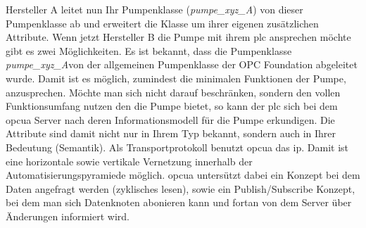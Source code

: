 Hersteller A leitet nun Ihr Pumpenklasse (\emph{pumpe\_xyz\_A}) von dieser Pumpenklasse ab und erweitert die Klasse um ihrer eigenen zusätzlichen Attribute.
Wenn jetzt Hersteller B die Pumpe mit ihrem \ac{plc} ansprechen möchte gibt es zwei Möglichkeiten.
Es ist bekannt, dass die Pumpenklasse \glqq \emph{pumpe\_xyz\_A}\grqq{}von der allgemeinen Pumpenklasse der OPC Foundation abgeleitet wurde.
Damit ist es möglich, zumindest die minimalen Funktionen der Pumpe, anzusprechen. 
Möchte man sich nicht darauf beschränken, sondern den vollen Funktionsumfang nutzen den die Pumpe bietet, 
so kann der \ac{plc} sich bei dem \ac{opcua} Server nach deren Informationsmodell für die Pumpe erkundigen.
Die Attribute sind damit nicht nur in Ihrem Typ bekannt, sondern auch in Ihrer Bedeutung (Semantik).
Als Transportprotokoll benutzt \ac{opcua} das \ac{ip}. 
Damit ist eine horizontale sowie vertikale Vernetzung innerhalb der Automatisierungspyramiede möglich.
\ac{opcua} untersützt dabei ein Konzept bei dem Daten angefragt werden (zyklisches lesen), sowie ein Publish/Subscribe Konzept, 
bei dem man sich Datenknoten abonieren kann und fortan von dem Server über Änderungen informiert wird.

